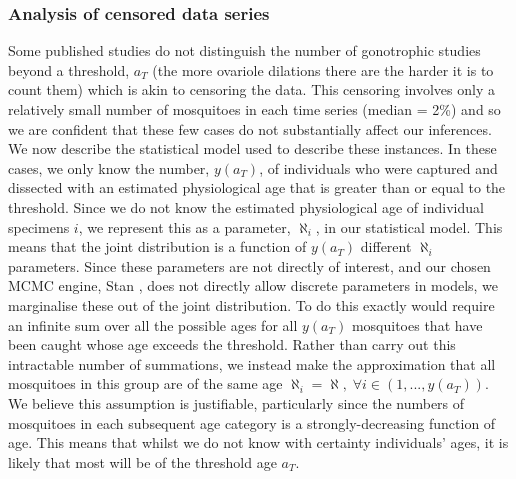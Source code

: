 \documentclass[12pt]{article}
\begin{document}
{\subsubsection{Analysis of censored data series}\label{sec:dissection_censored}
Some published studies do not distinguish the number of gonotrophic studies beyond a threshold, $a_T$ (the more ovariole dilations there are the harder it is to count them) which is akin to censoring the data. This censoring involves only a relatively small number of mosquitoes in each time series (median = 2\%) and so we are confident that these few cases do not substantially affect our inferences. We now describe the statistical model used to describe these instances. In these cases, we only know the number, $y(a_T)$, of individuals who were captured and dissected with an estimated physiological age that is greater than or equal to the threshold. Since we do not know the estimated physiological age of individual specimens $i$, we represent this as a parameter, $\aleph_i$, in our statistical model. This means that the joint distribution is a function of $y(a_T)$ different $\aleph_i$ parameters. Since these parameters are not directly of interest, and our chosen MCMC engine, Stan \citep{stan-software:2014}, does not directly allow discrete parameters in models, we marginalise these out of the joint distribution. To do this exactly would require an infinite sum over all the possible ages for all $y(a_T)$ mosquitoes that have been caught whose age exceeds the threshold. Rather than carry out this intractable number of summations, we instead make the approximation that all mosquitoes in this group are of the same age $\aleph_i = \aleph,\; \forall i \in (1,...,y(a_T))$. We believe this assumption is justifiable, particularly since the numbers of mosquitoes in each subsequent age category is a strongly-decreasing function of age. This means that whilst we do not know with certainty individuals' ages, it is likely that most will be of the threshold age $a_T$.

}
\end{document}
